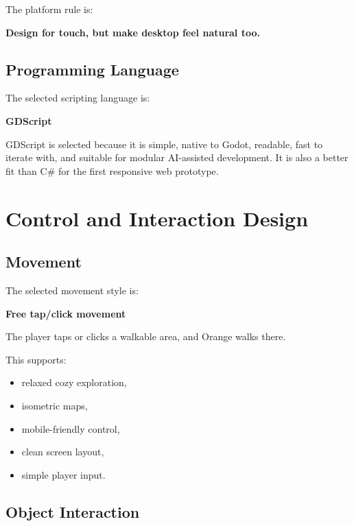 \documentclass[12pt]{article}
\begin{document}
The platform rule is:

\begin{center}
\textbf{Design for touch, but make desktop feel natural too.}
\end{center}

\subsection{Programming Language}

The selected scripting language is:

\begin{center}
\textbf{GDScript}
\end{center}

GDScript is selected because it is simple, native to Godot, readable, fast to iterate with, and suitable for modular AI-assisted development. It is also a better fit than C\# for the first responsive web prototype.

\section{Control and Interaction Design}

\subsection{Movement}

The selected movement style is:

\begin{center}
\textbf{Free tap/click movement}
\end{center}

The player taps or clicks a walkable area, and Orange walks there.

This supports:

\begin{itemize}[leftmargin=*]
    \item relaxed cozy exploration,
    \item isometric maps,
    \item mobile-friendly control,
    \item clean screen layout,
    \item simple player input.
\end{itemize}

\subsection{Object Interaction}
\end{document}
